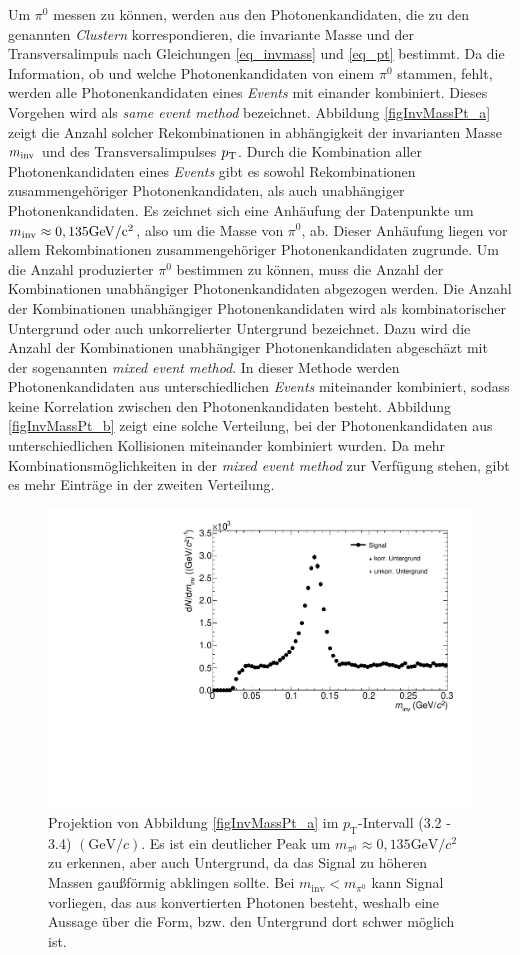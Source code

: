 Um $\pi^{0}$ messen zu k\"onnen, werden aus den Photonenkandidaten, die zu den genannten \textit{Clustern} korrespondieren, die invariante Masse und der Transversalimpuls nach Gleichungen \ref{eq_invmass} und \ref{eq_pt} bestimmt.
Da die Information, ob und welche Photonenkandidaten von einem $\pi^{0}$ stammen, fehlt, werden alle Photonenkandidaten eines \textit{Events} mit einander kombiniert.
Dieses Vorgehen wird als \textit{same event method} bezeichnet.
Abbildung \ref{figInvMassPt_a} zeigt die Anzahl solcher Rekombinationen in abh\"angigkeit der invarianten Masse $m_{\rm{inv}}$ und des Transversalimpulses $p_{\rm{T}}$.
Durch die Kombination aller Photonenkandidaten eines \textit{Events} gibt es sowohl Rekombinationen zusammengeh\"origer Photonenkandidaten, als auch unabh\"angiger Photonenkandidaten.
Es zeichnet sich eine Anh\"aufung der Datenpunkte um $m_{\rm{inv}}\approx 0,135\rm{GeV}/c^{2}$, also um die Masse von $\pi^{0}$, ab.
Dieser Anh\"aufung liegen vor allem Rekombinationen zusammengeh\"origer Photonenkandidaten zugrunde.
\newline
Um die Anzahl produzierter $\pi^{0}$ bestimmen zu k\"onnen, muss die Anzahl der Kombinationen unabh\"angiger Photonenkandidaten abgezogen werden.
Die Anzahl der Kombinationen unabh\"angiger Photonenkandidaten wird als kombinatorischer Untergrund oder auch unkorrelierter Untergrund bezeichnet.
Dazu wird die Anzahl der Kombinationen unabh\"angiger Photonenkandidaten abgesch\"azt mit der sogenannten \textit{mixed event method}.
In dieser Methode werden Photonenkandidaten aus unterschiedlichen \textit{Events} miteinander kombiniert, sodass keine Korrelation zwischen den Photonenkandidaten besteht.
Abbildung \ref{figInvMassPt_b} zeigt eine solche Verteilung, bei der Photonenkandidaten aus unterschiedlichen Kollisionen miteinander kombiniert wurden.
Da mehr Kombinationsm\"oglichkeiten in der \textit{mixed event method} zur Verf\"ugung stehen, gibt es mehr Eintr\"age in der zweiten Verteilung.
\begin{figure}[tbp]
\centering
\includegraphics[width=.6\linewidth]{hSignalPlusBkg.pdf}
\caption{Projektion von Abbildung \ref{figInvMassPt_a} im $p_{\text{T}}$-Intervall (3.2 - 3.4) $(\text{GeV/}c)$. Es ist ein deutlicher Peak um $m_{\pi^{0}} \approx 0,135\text{GeV/}c^{2}$ zu erkennen, aber auch Untergrund, da das Signal zu h{\"o}heren Massen gau{\ss}f{\"o}rmig abklingen sollte. Bei $m_{\text{inv}} < m_{\pi^{0}}$ kann Signal vorliegen, das aus konvertierten Photonen besteht, weshalb eine Aussage {\"u}ber die Form, bzw. den Untergrund dort schwer m{\"o}glich ist.}
\label{figSignalPlusBkg}
\end{figure}
